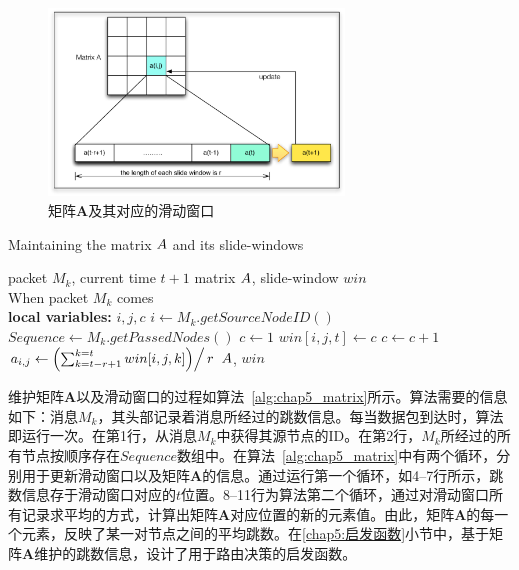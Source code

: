 \begin{figure}[bt]
  \centering\includegraphics[width=0.7\textwidth]{paper-HCH/matrix}
  \caption{矩阵$\bm{A}$及其对应的滑动窗口}
  \label{fig:chap5_matrix}
\end{figure}

\begin{algorithm}[tbp] %
\caption{Maintaining the matrix $\boldmath{A}$ and its slide-windows} %
\label{alg:chap5_matrix} %
\begin{algorithmic}[1] %
\REQUIRE  %
packet $M_k$, current time $t+1$
\ENSURE  %
matrix $\boldmath{A}$, slide-window $win$ \\
When packet $M_k$ comes\\
\textbf{local variables:} $i,j,c$
\STATE $i\leftarrow M_k.getSourceNodeID()$
\STATE $Sequence\leftarrow M_k.getPassedNodes()$
\STATE $c\leftarrow 1$
    \STATE $win[i,j,t]\leftarrow c$
    \STATE $c\leftarrow c+1$
\ENDFOR
{}
        \STATE $a_{i,j}\leftarrow \left(\sum_{k=t-r+1}^{k=t}win[i,j,k]\middle)\right/r$
    \ENDFOR
\ENDFOR
\RETURN $\boldmath{A}$, $win$ %
\end{algorithmic}
\end{algorithm}

维护矩阵$\bm{A}$以及滑动窗口的过程如算法~\ref{alg:chap5_matrix}所示。算法需要的信息如下：消息$M_k$，其头部记录着消息所经过的跳数信息。每当数据包到达时，算法即运行一次。在第1行，从消息$M_k$中获得其源节点的ID。在第2行，$M_k$所经过的所有节点按顺序存在$Sequence$数组中。在算法~\ref{alg:chap5_matrix}中有两个循环，分别用于更新滑动窗口以及矩阵$\bm{A}$的信息。通过运行第一个循环，如4--7行所示，跳数信息存于滑动窗口对应的$t$位置。8--11行为算法第二个循环，通过对滑动窗口所有记录求平均的方式，计算出矩阵$\bm{A}$对应位置的新的元素值。由此，矩阵$\bm{A}$的每一个元素，反映了某一对节点之间的平均跳数。在\ref{chap5:启发函数}小节中，基于矩阵$\bm{A}$维护的跳数信息，设计了用于路由决策的启发函数。

